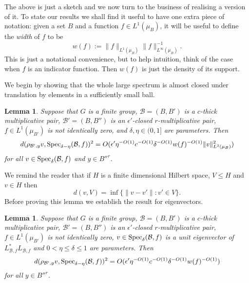 \documentclass[12pt]{amsart}
\numberwithin{equation}{section}
\theoremstyle{plain}
\newtheorem{lemma}[subsection]{Lemma}
\theoremstyle{definition}
\renewcommand{\leq}{\leqslant}
\providecommand{\Spec}{\mathop{\rm Spec}\nolimits}
\begin{document}
The above is just a sketch and we now turn to the business of realising a version of it.  To state our results we shall find it useful to have one extra piece of notation: given a set $B$ and a function $f \in L^1(\mu_B)$, it will be useful to define the \emph{width} of $f$ to be
\begin{equation*}
w(f):=\|f\|_{L^1(\mu_B)}\|f\|_{L^\infty(\mu_B)}^{-1}.
\end{equation*}
This is just a notational convenience, but to help intuition, think of the case when $f$ is an indicator function. Then $w(f)$ is just the density of its support.

We begin by showing that the whole large spectrum is almost closed under translation by elements in a sufficiently small ball. 
\begin{lemma}\label{lem.trans}
Suppose that $G$ is a finite group, $\mathcal{B}=(B,B')$ is a $c$-thick multiplicative pair, $\mathcal{B}'=(B,B'')$ is an $\epsilon'$-closed $r$-multiplicative pair, $f \in L^1(\mu_{B'})$ is not identically zero, and $\delta,\eta \in (0,1]$ are parameters. Then
\begin{equation*}
d(\rho_{\mathcal{B}',y}v,\Spec_{\delta-\eta}(\mathcal{B},f))^2 =O( \epsilon'\eta^{-O(1)}c^{-O(1)}\delta^{-O(1)}w(f)^{-O(1)}\|v\|_{L^2(\mu_B)}^2)
\end{equation*}
for all $v \in \Spec_\delta(\mathcal{B},f)$ and $y \in B''^r$.
\end{lemma}
We remind the reader that if $H$ is a finite dimensional Hilbert space, $V \leq H$ and $v \in H$ then
\begin{equation*}
d(v,V) = \inf{\{\|v-v'\| : v' \in V\}}.
\end{equation*}
Before proving this lemma we establish the result for eigenvectors.
\begin{lemma}
Suppose that $G$ is a finite group, $\mathcal{B}=(B,B')$ is a $c$-thick multiplicative pair, $\mathcal{B}'=(B,B'')$ is an $\epsilon'$-closed $r$-multiplicative pair, $f \in L^1(\mu_{B'})$ is not identically zero, $v \in \Spec_\delta(\mathcal{B},f)$ is a unit eigenvector of $L_{\mathcal{B},f}^*L_{\mathcal{B},f}$ and $0<\eta \leq \delta \leq 1$ are parameters.  Then
\begin{equation*}
d(\rho_{\mathcal{B}',y}v,\Spec_{\delta-\eta}(\mathcal{B},f))^2 =O( \epsilon'\eta^{-O(1)}c^{-O(1)}\delta^{-O(1)}w(f)^{-O(1)})
\end{equation*}
for all $y \in B''^r$.
\end{lemma}
\end{document}
